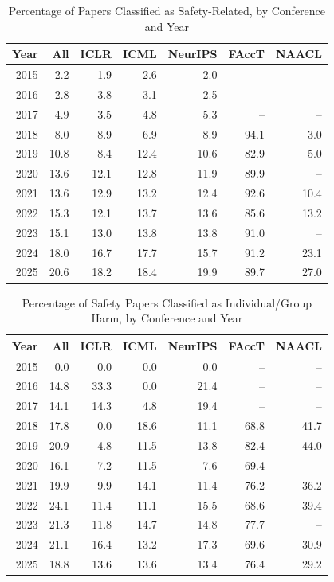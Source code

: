 \begin{table}[ht]
\centering
\caption{Percentage of Papers Classified as Safety-Related, by Conference and Year} 
\label{tab:summary_safety}
\begin{tabular}{rrrrrrr}
  \hline
Year & All & ICLR & ICML & NeurIPS & FAccT & NAACL \\ 
  \hline
2015 & 2.2 & 1.9 & 2.6 & 2.0 & -- & -- \\ 
  2016 & 2.8 & 3.8 & 3.1 & 2.5 & -- & -- \\ 
  2017 & 4.9 & 3.5 & 4.8 & 5.3 & -- & -- \\ 
  2018 & 8.0 & 8.9 & 6.9 & 8.9 & 94.1 & 3.0 \\ 
  2019 & 10.8 & 8.4 & 12.4 & 10.6 & 82.9 & 5.0 \\ 
  2020 & 13.6 & 12.1 & 12.8 & 11.9 & 89.9 & -- \\ 
  2021 & 13.6 & 12.9 & 13.2 & 12.4 & 92.6 & 10.4 \\ 
  2022 & 15.3 & 12.1 & 13.7 & 13.6 & 85.6 & 13.2 \\ 
  2023 & 15.1 & 13.0 & 13.8 & 13.8 & 91.0 & -- \\ 
  2024 & 18.0 & 16.7 & 17.7 & 15.7 & 91.2 & 23.1 \\ 
  2025 & 20.6 & 18.2 & 18.4 & 19.9 & 89.7 & 27.0 \\ 
   \hline
\end{tabular}
\end{table}
\begin{table}[ht]
\centering
\caption{Percentage of Safety Papers Classified as Individual/Group Harm, by Conference and Year} 
\label{tab:summary_indiv_grp_harm}
\begin{tabular}{rrrrrrr}
  \hline
Year & All & ICLR & ICML & NeurIPS & FAccT & NAACL \\ 
  \hline
2015 & 0.0 & 0.0 & 0.0 & 0.0 & -- & -- \\ 
  2016 & 14.8 & 33.3 & 0.0 & 21.4 & -- & -- \\ 
  2017 & 14.1 & 14.3 & 4.8 & 19.4 & -- & -- \\ 
  2018 & 17.8 & 0.0 & 18.6 & 11.1 & 68.8 & 41.7 \\ 
  2019 & 20.9 & 4.8 & 11.5 & 13.8 & 82.4 & 44.0 \\ 
  2020 & 16.1 & 7.2 & 11.5 & 7.6 & 69.4 & -- \\ 
  2021 & 19.9 & 9.9 & 14.1 & 11.4 & 76.2 & 36.2 \\ 
  2022 & 24.1 & 11.4 & 11.1 & 15.5 & 68.6 & 39.4 \\ 
  2023 & 21.3 & 11.8 & 14.7 & 14.8 & 77.7 & -- \\ 
  2024 & 21.1 & 16.4 & 13.2 & 17.3 & 69.6 & 30.9 \\ 
  2025 & 18.8 & 13.6 & 13.6 & 13.4 & 76.4 & 29.2 \\ 
   \hline
\end{tabular}
\end{table}
